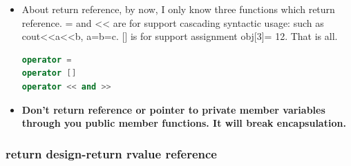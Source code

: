 \documentclass[a4paper,12pt,twoside]{book}
\begin{document}
\begin{itemize}
\item About return reference, by now, I only know three functions which return reference. = and << are for support cascading syntactic usage: such as cout<<a<<b, a=b=c.  [] is for support assignment obj[3]= 12.  That is all.
\begin{lstlisting}[frame=single, language=c++]
operator =
operator []
operator << and >>
\end{lstlisting}

\item \textbf{Don't return reference or pointer to private member variables through you public member functions. It will break encapsulation. }

\end{itemize}

\subsubsection{return design-return rvalue reference}
\end{document}
